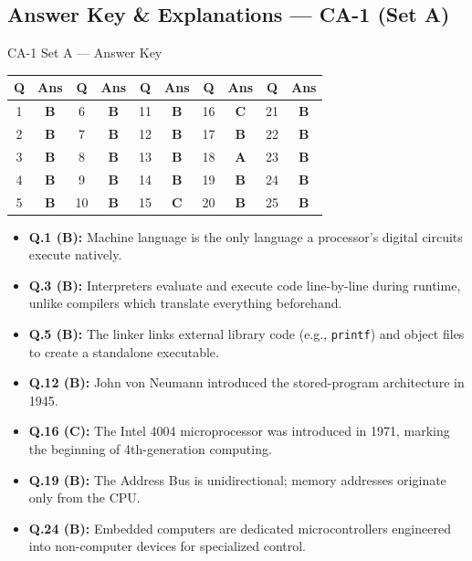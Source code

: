

\newpage
\subsection*{Answer Key \& Explanations --- CA-1 (Set A)}

\begin{answerkeytable}{CA-1 Set A --- Answer Key}
\begin{tabular}{*{10}{c}}
\toprule
\textbf{Q} & \textbf{Ans} & \textbf{Q} & \textbf{Ans} & \textbf{Q} & \textbf{Ans} & \textbf{Q} & \textbf{Ans} & \textbf{Q} & \textbf{Ans} \\
\midrule
1 & \textbf{B} & 6 & \textbf{B} & 11 & \textbf{B} & 16 & \textbf{C} & 21 & \textbf{B} \\
2 & \textbf{B} & 7 & \textbf{B} & 12 & \textbf{B} & 17 & \textbf{B} & 22 & \textbf{B} \\
3 & \textbf{B} & 8 & \textbf{B} & 13 & \textbf{B} & 18 & \textbf{A} & 23 & \textbf{B} \\
4 & \textbf{B} & 9 & \textbf{B} & 14 & \textbf{B} & 19 & \textbf{B} & 24 & \textbf{B} \\
5 & \textbf{B} & 10 & \textbf{B} & 15 & \textbf{C} & 20 & \textbf{B} & 25 & \textbf{B} \\
\bottomrule
\end{tabular}
\end{answerkeytable}

\begin{expbox}
\begin{itemize}[leftmargin=5mm]
    \item \textbf{Q.1 (B):} Machine language is the only language a processor's digital circuits execute natively.
    \item \textbf{Q.3 (B):} Interpreters evaluate and execute code line-by-line during runtime, unlike compilers which translate everything beforehand.
    \item \textbf{Q.5 (B):} The linker links external library code (e.g., \texttt{printf}) and object files to create a standalone executable.
    \item \textbf{Q.12 (B):} John von Neumann introduced the stored-program architecture in 1945.
    \item \textbf{Q.16 (C):} The Intel 4004 microprocessor was introduced in 1971, marking the beginning of 4th-generation computing.
    \item \textbf{Q.19 (B):} The Address Bus is unidirectional; memory addresses originate only from the CPU.
    \item \textbf{Q.24 (B):} Embedded computers are dedicated microcontrollers engineered into non-computer devices for specialized control.
\end{itemize}
\end{expbox}

\newpage
